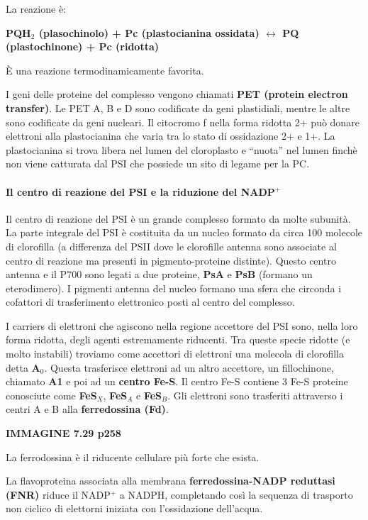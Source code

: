 \documentclass[]{article}
\begin{document}
La reazione è:

\textbf{PQH$_2$ (plasochinolo) + Pc (plastocianina ossidata)
$\leftrightarrow$ PQ (plastochinone) + Pc (ridotta)}

È una reazione termodinamicamente favorita.

I geni delle proteine del complesso vengono chiamati \textbf{PET
(protein electron transfer)}. Le PET A, B e D sono codificate da geni
plastidiali, mentre le altre sono codificate da geni nucleari. Il
citocromo f nella forma ridotta 2+ può donare elettroni alla
plastocianina che varia tra lo stato di ossidazione 2+ e 1+. La
plastocianina si trova libera nel lumen del cloroplasto e ``nuota'' nel
lumen finchè non viene catturata dal PSI che possiede un sito di legame
per la PC.

\paragraph{Il centro di reazione del PSI e la riduzione del
NADP$^+$}\label{il-centro-di-reazione-del-psi-e-la-riduzione-del-nadp}

Il centro di reazione del PSI è un grande complesso formato da molte
subunità. La parte integrale del PSI è costituita da un nucleo formato
da circa 100 molecole di clorofilla (a differenza del PSII dove le
clorofille antenna sono associate al centro di reazione ma presenti in
pigmento-proteine distinte). Questo centro antenna e il P700 sono legati
a due proteine, \textbf{PsA} e \textbf{PsB} (formano un eterodimero). I
pigmenti antenna del nucleo formano una sfera che circonda i cofattori
di trasferimento elettronico posti al centro del complesso.

I carriers di elettroni che agiscono nella regione accettore del PSI
sono, nella loro forma ridotta, degli agenti estremamente riducenti. Tra
queste specie ridotte (e molto instabili) troviamo come accettori di
elettroni una molecola di clorofilla detta \textbf{A$_0$}. Questa
trasferisce elettroni ad un altro accettore, un fillochinone, chiamato
\textbf{A1} e poi ad un \textbf{centro Fe-S}. Il centro Fe-S contiene 3
Fe-S proteine conosciute come \textbf{FeS$_X$}, \textbf{FeS$_A$} e
\textbf{FeS$_B$}. Gli elettroni sono trasferiti attraverso i centri A e
B alla \textbf{ferredossina (Fd)}.

\textbf{IMMAGINE 7.29 p258}

La ferrodossina è il riducente cellulare più forte che esista.

La flavoproteina associata alla membrana \textbf{ferredossina-NADP
reduttasi (FNR)} riduce il NADP$^+$ a NADPH, completando così la
sequenza di trasporto non ciclico di elettorni iniziata con
l'ossidazione dell'acqua.
\end{document}
